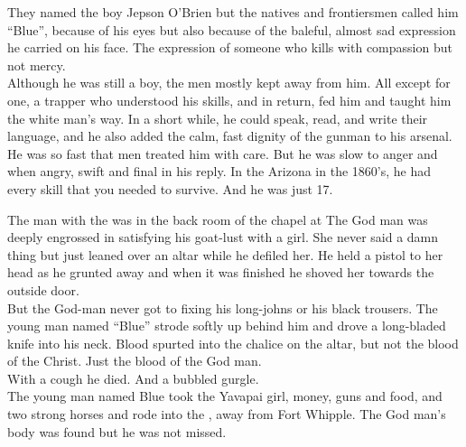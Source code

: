 They named the boy Jepson O'Brien but the natives and frontiersmen called him ``Blue'', because of his eyes but also because of the baleful, almost sad expression he carried on his face. The expression of someone who kills with compassion but not mercy. \\

Although he was still a boy, the men mostly kept away from him. All except for one, a trapper who understood his skills, and in return, fed him and taught him the white man's way. In a short while, he could speak, read, and write their language, and he also added the calm, fast dignity of the gunman to his arsenal. \\

He was so fast that men treated him with care. But he was slow to anger and when angry, swift and final in his reply. In the Arizona  in the 1860's, he had every skill that you needed to survive. And he was just 17. \\





The  man with the  was in the back room of the chapel at  The God man was deeply engrossed in satisfying his goat-lust with a  girl. She never said a damn thing but just leaned over an altar while he defiled her. He held a pistol to her head as he grunted away and when it was finished he shoved her towards the outside door. \\

But the God-man never got to fixing his long-johns or his black trousers. The young man named ``Blue'' strode softly up behind him and drove a long-bladed knife into his neck. Blood spurted into the chalice on the altar, but not the blood of the Christ. Just the blood of the God man. \\

With a cough he died. And a bubbled gurgle. \\

The young man named Blue took the Yavapai girl, money, guns and food, and two strong horses and rode into the , away from Fort Whipple. The God man's body was found but he was not missed. \\

